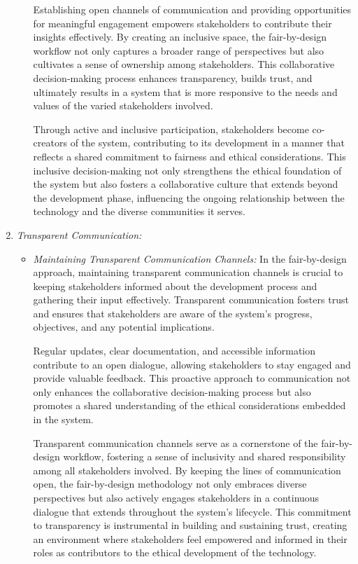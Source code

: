\begin{enumerate}
\begin{itemize}
        Establishing open channels of communication and providing opportunities for meaningful engagement empowers stakeholders to contribute their insights effectively. By creating an inclusive space, the fair-by-design workflow not only captures a broader range of perspectives but also cultivates a sense of ownership among stakeholders. This collaborative decision-making process enhances transparency, builds trust, and ultimately results in a system that is more responsive to the needs and values of the varied stakeholders involved.
        
        Through active and inclusive participation, stakeholders become co-creators of the system, contributing to its development in a manner that reflects a shared commitment to fairness and ethical considerations. This inclusive decision-making not only strengthens the ethical foundation of the system but also fosters a collaborative culture that extends beyond the development phase, influencing the ongoing relationship between the technology and the diverse communities it serves.

    \end{itemize}
    
    \item \emph{Transparent Communication:}
    
    \begin{itemize}

        \item \emph{Maintaining Transparent Communication Channels:} In the fair-by-design approach, maintaining transparent communication channels is crucial to keeping stakeholders informed about the development process and gathering their input effectively. Transparent communication fosters trust and ensures that stakeholders are aware of the system's progress, objectives, and any potential implications.

        Regular updates, clear documentation, and accessible information contribute to an open dialogue, allowing stakeholders to stay engaged and provide valuable feedback. This proactive approach to communication not only enhances the collaborative decision-making process but also promotes a shared understanding of the ethical considerations embedded in the system.
        
        Transparent communication channels serve as a cornerstone of the fair-by-design workflow, fostering a sense of inclusivity and shared responsibility among all stakeholders involved. By keeping the lines of communication open, the fair-by-design methodology not only embraces diverse perspectives but also actively engages stakeholders in a continuous dialogue that extends throughout the system's lifecycle. This commitment to transparency is instrumental in building and sustaining trust, creating an environment where stakeholders feel empowered and informed in their roles as contributors to the ethical development of the technology.

    \end{itemize}

\end{enumerate}

